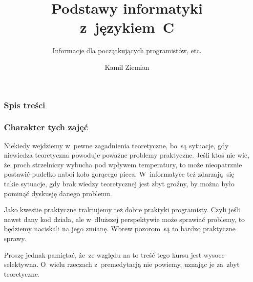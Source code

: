 \documentclass[10pt,t]{beamer}
\title{Podstawy informatyki z~językiem~C}
\subtitle{Informacje dla początkujących programistów, etc.}
\author{Kamil Ziemian \\
  \email}
\begin{document}





\RaggedRight





\maketitle





\begin{frame}
  \frametitle{Spis treści}


  \tableofcontents

\end{frame}










\begin{frame}
  \frametitle{Charakter tych zajęć}


  Niekiedy wejdziemy w~pewne zagadnienia teoretyczne, bo~są sytuacje, gdy
  niewiedza teoretyczna powoduje poważne problemy praktyczne. Jeśli ktoś
  nie wie, że~proch strzelniczy wybucha pod wpływem temperatury, to może
  nieopatrznie postawić pudełko naboi koło gorącego pieca. W~informatyce
  też zdarzają~się takie sytuacje, gdy brak wiedzy teoretycznej jest zbyt
  groźny, by można było pominąć dyskusję danego problemu.

  Jako kwestie praktyczne traktujemy też dobre praktyki programisty.
  Czyli jeśli nawet dany kod działa, ale w~dłuższej perspektywie może
  sprawiać problemy, to będziemy naciskali na jego zmianę. Wbrew
  pozorom~są to bardzo praktyczne sprawy.

  Proszę jednak pamiętać, że~ze względu na to treść tego kursu jest wysoce
  selektywna. O~wielu rzeczach z~premedytacją nie powiemy, uznając je
  za~zbyt teoretyczne.

\end{frame}
\end{document}

